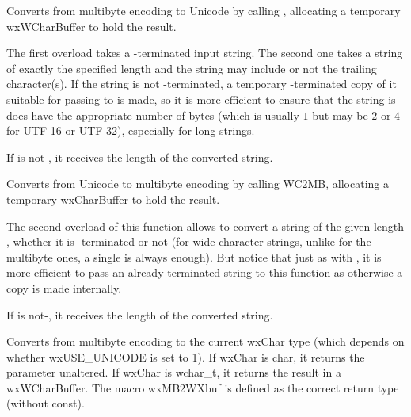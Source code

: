 
Converts from multibyte encoding to Unicode by calling 
, allocating a temporary wxWCharBuffer to hold
the result.

The first overload takes a \NUL-terminated input string. The second one takes a
string of exactly the specified length and the string may include or not the
trailing \NUL character(s). If the string is not \NUL-terminated, a temporary 
\NUL-terminated copy of it suitable for passing to  
is made, so it is more efficient to ensure that the string is does have the
appropriate number of \NUL bytes (which is usually $1$ but may be $2$ or $4$
for UTF-16 or UTF-32), especially for long strings.

If  is not-\NULL, it receives the length of the converted
string.


\label{wxmbconvcwc2mb}



Converts from Unicode to multibyte encoding by calling WC2MB,
allocating a temporary wxCharBuffer to hold the result.

The second overload of this function allows to convert a string of the given
length , whether it is \NUL-terminated or not (for wide character
strings, unlike for the multibyte ones, a single \NUL is always enough).
But notice that just as with , it is more
efficient to pass an already terminated string to this function as otherwise a
copy is made internally.

If  is not-\NULL, it receives the length of the converted
string.


\label{wxmbconvcmb2wx}



Converts from multibyte encoding to the current wxChar type
(which depends on whether wxUSE\_UNICODE is set to 1). If wxChar is char,
it returns the parameter unaltered. If wxChar is wchar\_t, it returns the
result in a wxWCharBuffer. The macro wxMB2WXbuf is defined as the correct
return type (without const).



